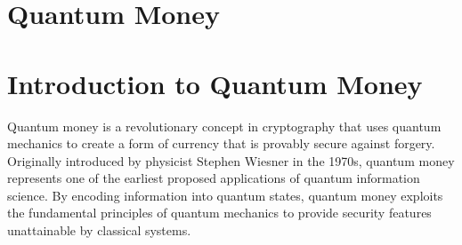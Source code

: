 \documentclass[11pt]{article}
\theoremstyle{definition}
\begin{document}
\section{Quantum Money}
\section*{Introduction to Quantum Money}
Quantum money is a revolutionary concept in cryptography that uses quantum mechanics to create a form of currency that is provably secure against forgery. Originally introduced by physicist Stephen Wiesner in the 1970s, quantum money represents one of the earliest proposed applications of quantum information science. By encoding information into quantum states, quantum money exploits the fundamental principles of quantum mechanics to provide security features unattainable by classical systems.



\end{document}
